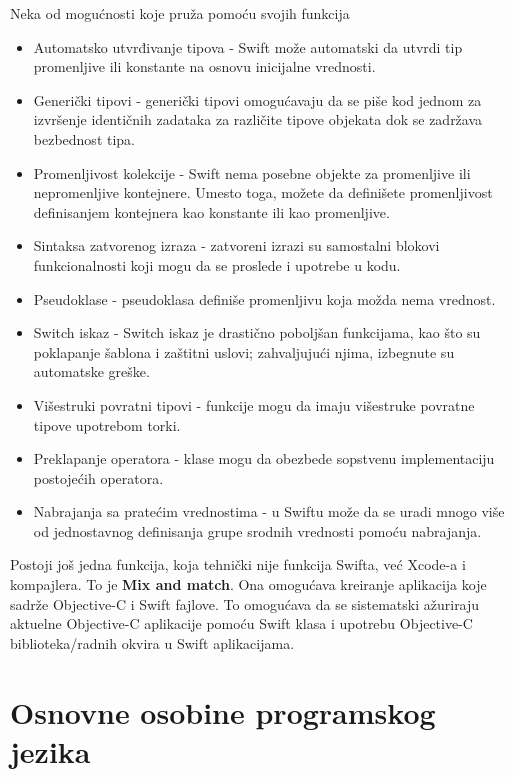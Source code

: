 \documentclass[a4paper]{article}
\begin{document}
Neka od mogućnosti koje pruža pomoću svojih funkcija \cite{mastering_swift3}
\begin{itemize}
\item Automatsko utvrđivanje tipova - Swift može automatski da utvrdi tip promenljive ili konstante na osnovu inicijalne
vrednosti. 
\item Generički tipovi - generički tipovi omogućavaju da se piše kod jednom za izvršenje identičnih
zadataka za različite tipove objekata dok se zadržava bezbednost tipa. 
\item Promenljivost kolekcije - Swift nema posebne objekte za promenljive ili nepromenljive kontejnere. Umesto
toga, možete da definišete promenljivost definisanjem kontejnera kao konstante
ili kao promenljive.
\item Sintaksa zatvorenog izraza - zatvoreni izrazi su samostalni blokovi funkcionalnosti koji mogu da se proslede i upotrebe u kodu.
\item Pseudoklase - pseudoklasa definiše promenljivu koja možda nema vrednost.
\item Switch iskaz - Switch iskaz je drastično poboljšan funkcijama, kao što su poklapanje šablona i
zaštitni uslovi; zahvaljujući njima, izbegnute su automatske greške.
\item Višestruki povratni tipovi - funkcije mogu da imaju višestruke povratne tipove upotrebom torki. 
\item Preklapanje operatora - klase mogu da obezbede sopstvenu implementaciju postojećih operatora. 
\item Nabrajanja sa pratećim vrednostima - u Swiftu može da se uradi mnogo više od jednostavnog definisanja grupe srodnih vrednosti pomoću nabrajanja.
\end{itemize}

Postoji još jedna funkcija, koja tehnički nije
funkcija Swifta, već Xcode-a i kompajlera. To je \textbf{Mix and match}. Ona omogućava kreiranje aplikacija koje sadrže Objective-C i Swift fajlove. To omogućava da se sistematski ažuriraju aktuelne Objective-C aplikacije pomoću Swift klasa i upotrebu Objective-C biblioteka/radnih okvira u Swift aplikacijama.



\section{Osnovne osobine programskog jezika}	
\label{sec:treciDeo}
\end{document}
